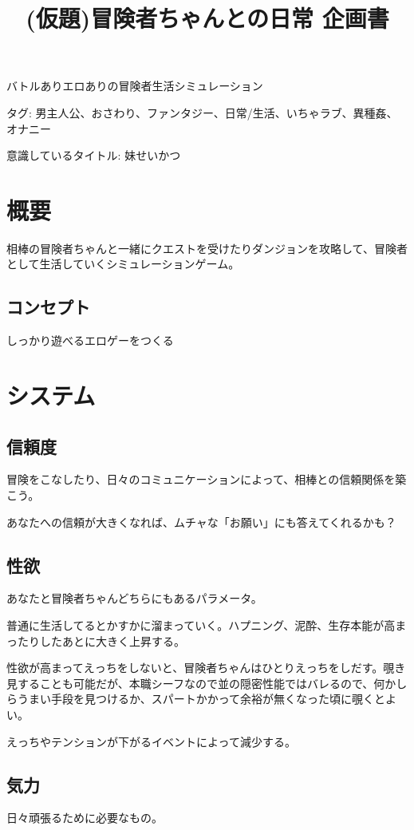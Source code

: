 \documentclass{mynote}
\begin{document}
\title{(仮題)冒険者ちゃんとの日常 企画書}
\date{}
\maketitle

バトルありエロありの冒険者生活シミュレーション

タグ: 男主人公、おさわり、ファンタジー、日常/生活、いちゃラブ、異種姦、オナニー

意識しているタイトル: 妹せいかつ
\section{概要}

相棒の冒険者ちゃんと一緒にクエストを受けたりダンジョンを攻略して、冒険者として生活していくシミュレーションゲーム。
\subsection{コンセプト}
しっかり遊べるエロゲーをつくる

\section{システム}
\subsection{信頼度}
冒険をこなしたり、日々のコミュニケーションによって、相棒との信頼関係を築こう。

あなたへの信頼が大きくなれば、ムチャな「お願い」にも答えてくれるかも？

\subsection{性欲}
あなたと冒険者ちゃんどちらにもあるパラメータ。

普通に生活してるとかすかに溜まっていく。ハプニング、泥酔、生存本能が高まったりしたあとに大きく上昇する。

性欲が高まってえっちをしないと、冒険者ちゃんはひとりえっちをしだす。覗き見することも可能だが、本職シーフなので並の隠密性能ではバレるので、何かしらうまい手段を見つけるか、スパートかかって余裕が無くなった頃に覗くとよい。

えっちやテンションが下がるイベントによって減少する。

\subsection{気力}
日々頑張るために必要なもの。
\end{document}
